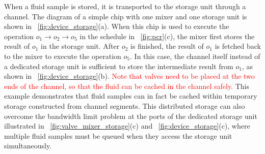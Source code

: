 When a fluid sample is stored, it is transported to the storage unit through a
channel. The diagram of a simple chip with one mixer and one storage unit is
shown in \figname~\ref{fig:device_storage}(a). When this chip is used to execute
the operation $o_1\to o_2\to o_5$ in the schedule in
\figname~\ref{fig:pcr}(c), the mixer first stores the result of $o_1$ in the
storage unit. After $o_2$ is finished, the result of $o_1$ is fetched back to
the mixer to execute the operation $o_5$.
In this case,  the channel itself instead of a dedicated
storage unit is sufficient to store the intermediate result from $o_1$,
as shown in \figname~\ref{fig:device_storage}(b). \textcolor{red}{Note that valves need to be placed at the two ends of the channel, so that the fluid can be cached in the channel safely.} This example demonstrates that
fluid samples can in fact be cached  within temporary
storage constructed from channel segments. This distributed storage can also
overcome the bandwidth limit problem at the ports of the dedicated storage unit
illustrated in \figname~\ref{fig:valve_mixer_storage}(c)
and \figname~\ref{fig:device_storage}(c), where multiple fluid samples must be queued when they access the storage unit
simultaneously.

